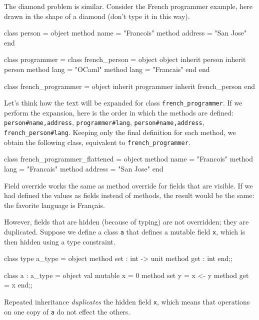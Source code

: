 The diamond problem is similar.  Consider the French programmer example, here
drawn in the shape of a diamond (don't type it in this way).

\begin{center}
\begin{minipage}{4in}
\begin{ocamllisting}
                      class person =
                      object
                          method name = "Francois"
                          method address = "San Jose"
                      end

class programmer =                     class french_person =
object                                 object
   inherit person                         inherit person
   method lang = "OCaml"                  method lang = "Francais"
end                                    end

                      class french_programmer =
                      object
                          inherit programmer
                          inherit french_person
                      end
\end{ocamllisting}
\end{minipage}
\end{center}
%
Let's think how the text will be expanded for class \hbox{\lstinline/french_programmer/}.  If we perform the expansion,
here is the order in which the methods are defined:
\hbox{\lstinline/person#name,address/}, \hbox{\lstinline/programmer#lang/}, \hbox{\lstinline/person#name,address/}, \hbox{\lstinline/french_person#lang/}.
Keeping only the final definition for each method, we obtain the following class,
equivalent to \hbox{\lstinline/french_programmer/}.

\begin{ocaml}
class french_programmer_flattened =
object
   method name = "Francois"
   method lang = "Francais"
   method address = "San Jose"
end
\end{ocaml}
%
Field override works the same as method override for fields that are visible.  If we had defined the
values as fields instead of methods, the result would be the same: the
favorite language is Fran\c{c}ais.

However, fields that are hidden (because of typing) are not overridden; they are duplicated.
Suppose we define a class \hbox{\lstinline/a/} that defines a mutable field \hbox{\lstinline/x/}, which is then
hidden using a type constraint.

\begin{ocaml}
class type a_type =
object
   method set : int -> unit
   method get : int
end;;

class a : a_type =
object
   val mutable x = 0
   method set y = x <- y
   method get = x
end;;
\end{ocaml}
%
Repeated inheritance \emph{duplicates} the hidden field \hbox{\lstinline/x/}, which means that operations
on one copy of \hbox{\lstinline/a/} do not effect the others.

